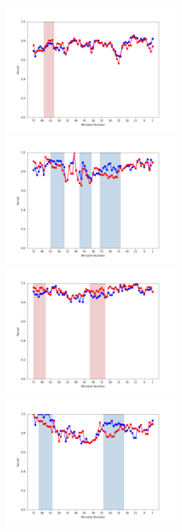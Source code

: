 \documentclass[submit]{ipsj}
\begin{document}
\begin{figure}[t]
\begin{minipage}{\textwidth}
\vspace{0.08\textheight}
\begin{center}
    \includegraphics[width=0.495\textwidth]{Uenaka_fig/RQ2_result/Nova/Nova_review_Recall.pdf}
    \includegraphics[width=0.495\textwidth]{Uenaka_fig/RQ2_result/Neutron/Neutron_review_Recall.pdf}
    \includegraphics[width=0.495\textwidth]{Uenaka_fig/RQ2_result/Cinder/Cinder_review_Recall.pdf}
    \includegraphics[width=0.495\textwidth]{Uenaka_fig/RQ2_result/Keystone/Keystone_review_Recall.pdf}

\end{center}
\end{minipage}
\end{figure}
\end{document}
